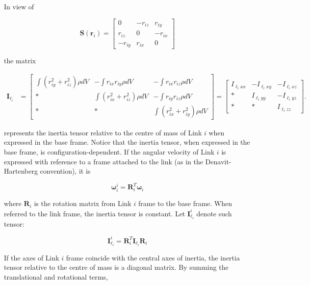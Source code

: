 \documentclass[10pt]{article}
\begin{document}
In view of 

$$
\boldsymbol{S}\left(\boldsymbol{r}_{i}\right)=\left[\begin{array}{ccc}
0 & -r_{i z} & r_{i y} \\
r_{i z} & 0 & -r_{i x} \\
-r_{i y} & r_{i x} & 0
\end{array}\right]
$$


the matrix

$$
\begin{aligned}
\boldsymbol{I}_{\ell_{i}} & =\left[\begin{array}{ccc}
\int\left(r_{i y}^{2}+r_{i z}^{2}\right) \rho d V & -\int r_{i x} r_{i y} \rho d V & -\int r_{i x} r_{i z} \rho d V \\
* & \int\left(r_{i x}^{2}+r_{i z}^{2}\right) \rho d V & -\int r_{i y} r_{i z} \rho d V \\
* & * & \int\left(r_{i x}^{2}+r_{i y}^{2}\right) \rho d V
\end{array}\right] 
=  {\left[\begin{array}{ccc}
I_{\ell_{i} x x} & -I_{\ell_{i} x y} & -I_{\ell_{i} x z} \\
* & I_{\ell_{i} y y} & -I_{\ell_{i} y z} \\
* & * & I_{\ell_{i} z z}
\end{array}\right] . }
\end{aligned}
$$

represents the inertia tensor relative to the centre of mass of Link $i$ when expressed in the base frame. Notice that the inertia tensor, when expressed in the base frame, is configuration-dependent. If the angular velocity of Link $i$ is expressed with reference to a frame attached to the link (as in the Denavit-Hartenberg convention), it is

$$
\boldsymbol{\omega}_{i}^{i}=\boldsymbol{R}_{i}^{T} \boldsymbol{\omega}_{i}
$$

where $\boldsymbol{R}_{i}$ is the rotation matrix from Link $i$ frame to the base frame. When referred to the link frame, the inertia tensor is constant. Let $\boldsymbol{I}_{\ell_{i}}^{i}$ denote such tensor:

$$
\boldsymbol{I}_{\ell_{i}}^{i}=\boldsymbol{R}_{i}^{T} \boldsymbol{I}_{\ell_{i}} \boldsymbol{R}_{i}
$$

If the axes of Link $i$ frame coincide with the central axes of inertia, the inertia tensor relative to the centre of mass is a diagonal matrix. By summing the translational and rotational terms, 
\end{document}
